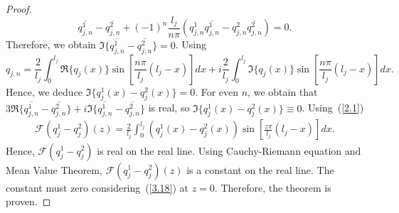\documentclass[10pt,a4paper]{amsart}
\begin{document}
\begin{proof}
\begin{equation}
\overline{q^{1}_{j,n}}-\overline{{q}^{2}_{j,n}}+(-1)^{n}\frac{l_{j}}{n\pi}(q^{1}_{j,n}\overline{q^{1}_{j,n}}-q^{2}_{j,n}\overline{q^{2}_{j,n}})=0.
\end{equation}
Therefore, we obtain $\Im \{\overline{q^{1}_{j,n}}-\overline{{q}^{2}_{j,n}}\}=0$.
Using $$q_{j,n}=\frac{2}{l_{j}}\int_{0}^{l_{j}}\Re\{q_{j}(x)\}\sin[\frac{n\pi}{l_{j}} (l_{j}-x)]dx+i\frac{2}{l_{j}}\int_{0}^{l_{j}}\Im\{q_{j}(x)\}\sin[\frac{n\pi}{l_{j}} (l_{j}-x)]dx.$$
Hence, we deduce $\Im\{q_{j}^{1}(x)-q_{j}^{2}(x)\}=0$. For even $n$, we obtain that $3\Re\{\overline{q^{1}_{j,n}}-\overline{{q}^{2}_{j,n}}\}+i\Im\{\overline{q^{1}_{j,n}}-\overline{{q}^{2}_{j,n}}\}$ is real, so  $\Im\{q_{j}^{1}(x)-q_{j}^{2}(x)\}\equiv0$. 
Using~(\ref{2.1})
\begin{eqnarray}\label{3.18}
\mathcal{F}(q^{1}_{j}-q^{2}_{j})(z)=\frac{2}{l_{j}}\int_{0}^{l_{j}}(q^{1}_{j}(x)-q^{2}_{j}(x))\sin[\frac{z\pi}{l_{j}} (l_{j}-x)]dx.
\end{eqnarray}
Hence, $\mathcal{F}(q^{1}_{j}-q^{2}_{j})$ is real on the real line. Using Cauchy-Riemann equation and Mean Value Theorem, $\mathcal{F}(q^{1}_{j}-q^{2}_{j})(z)$ is a constant on the real line. The constant must zero considering~(\ref{3.18}) at $z=0$. Therefore, the theorem is proven.





\end{proof}
\end{document}
